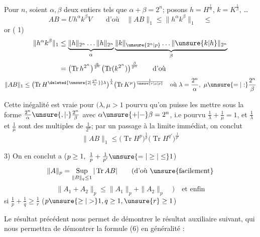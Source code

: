 Pour  $n$, soient $\alpha,\beta$ deux entiers tels que $\alpha+\beta=2^n$;
posons $h=H^{\frac1\alpha}$, $k=K^{\frac1\beta}$, \ldots
\[
AB=Uh^\alpha k^\beta V\qquad\text{d'où}\quad\|AB\|_1\leq\|h^\alpha k^\beta\|_1\quad\leq
\]
or ( 1)
\[
\begin{aligned}
\|h^\alpha k^\beta\|_1&\leq
\underbrace{\|h\|_{2^n}\ldots\|h\|_{2^n}}_{\alpha}
\underbrace{\|k\|_{\unsure{2^n|p}}\ldots\|\unsure{k|h}\|_{2^n}}_{\beta}\\
&=\bigl(\operatorname{Tr} h^{2^n}\bigr)^{\frac\alpha{2^n}}
\bigl(\operatorname{Tr}(k^{2^n})\bigr)^{\frac\beta{2^n}}\qquad\text{d'où}
\end{aligned}
\]
\[
\|AB\|_1\leq\bigl(\operatorname{Tr}H^{\deleted{\unsure{2|\frac{2^n}{\alpha}}}\lambda}\bigr)^{\frac1\lambda}
\bigl(\operatorname{Tr}K^\mu\bigr)^{\frac1{\unsure{r|\mu|p}}}
\quad\text{où }\lambda=\frac{2^n}{\alpha},\ \mu\unsure{=|:}\frac{2^n}{\beta}
\]

Cette inégalité est vraie pour  $(\lambda,\mu>1$ pourvu qu'on puisse les mettre sous la  forme
$\frac{2^n}{\alpha}\unsure{,|\cdot}\frac{2^n}{\beta}$ avec $\alpha\unsure{+|-}\beta=2^n$,
i.e pourvu $\frac1\lambda+\frac1\mu=1$, 
et $\frac1\lambda$ et $\frac1\mu$ sont des multiples de $\frac1{2^n}$;
par un passage à la limite immédiat, on conclut
\[
\|AB\|_1\leq\bigl(\operatorname{Tr}H^p\bigr)^{\frac1p}
\bigl(\operatorname{Tr}H^{q'}\bigr)^{\frac1{p'}}
\]

3) On en conclut  a ($p\geq1,\ \frac1p+\frac1{p'}\unsure{=|\geq|\leq}1$)
\[
\|A\|_p=\operatorname*{Sup}_{\|B\|_q\leq1}|\operatorname{Tr} AB|\qquad\text{(d'où \unsure{facilement}}
\]
\[
\|A_1+A_2\|_p\leq\|A_1\|_p+\|A_2\|_p\quad)\quad\text{et enfin}
\]
 si $\frac1p+\frac1q\geq\frac1r$ \quad ($p\unsure{\geq|>}1,q\geq1,\unsure{r}\geq1$)

Le résultat précédent nous permet de démontrer le résultat auxiliaire suivant, qui nous permettra de démontrer la formule (6) en  généralité :

